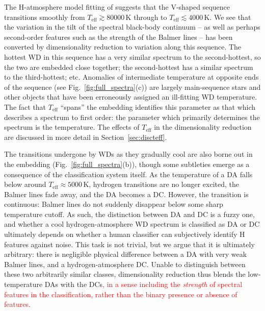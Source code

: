 \documentclass[fleqn,usenatbib]{mnras}
\def\Teff{T_\mathrm{eff}}
\newcommand{\red}[1]{\textcolor{red}{#1}}
\begin{document}
The H-atmosphere model fitting of \citet{gentilefusillo19} suggests that the V-shaped sequence transitions smoothly from $\Teff \gtrsim 80000\,\text{K}$ through to $\Teff \lesssim 4000\,\text{K}$.
We see that the variation in the tilt of the spectral black-body continuum -- as well as perhaps second-order features such as the strength of the Balmer lines -- has been converted by dimensionality reduction to variation along this sequence.
The hottest WD in this sequence has a very similar spectrum to the second-hottest, so the two are embedded close together; the second-hottest has a similar spectrum to the third-hottest; etc.
Anomalies of intermediate temperature at opposite ends of the sequence (see Fig.~\ref{fig:full_spectra}(c)) are largely main-sequence stars and other objects that have been erroneously assigned an ill-fitting WD temperature.
The fact that $\Teff$ ``spans'' the embedding identifies this parameter as that which describes a spectrum to first order: the parameter which primarily determines the spectrum is the temperature.
The effects of $\Teff$ in the dimensionality reduction are discussed in more detail in Section~\ref{sec:discteff}.

The transitions undergone by WDs as they gradually cool are also borne out in the embedding (Fig.~\ref{fig:full_spectra}(b)), though some subtleties emerge as a consequence of the classification system itself.
As the temperature of a DA falls below around $\Teff\approx 5000\,\text{K}$, hydrogen transitions are no longer excited, the Balmer lines fade away, and the DA becomes a DC.
However, the transition is continuous: Balmer lines do not suddenly disappear below some sharp temperature cutoff.
As such, the distinction between DA and DC is a fuzzy one, and whether a cool hydrogen-atmosphere WD spectrum is classified as DA or DC ultimately depends on whether a human classifier can subjectively identify H features against noise.
This task is not trivial, but we argue that it is ultimately arbitrary: there is negligible physical difference between a DA with very weak Balmer lines, and a hydrogen-atmosphere DC.
Unable to distinguish between these two arbitrarily similar classes, dimensionality reduction thus blends the low-temperature DAs with the DCs\red{, in a sense including the \textit{strength} of spectral features in the classification, rather than the binary presence or absence of features}.
\end{document}
